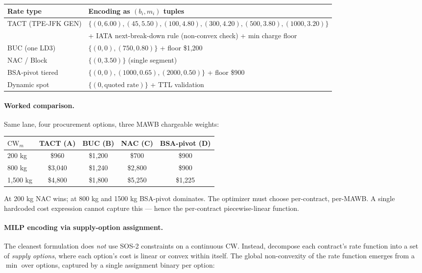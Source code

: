 \documentclass[11pt,a4paper]{article}
\theoremstyle{definition}
\begin{document}
\begin{center}
\begin{tabular}{ll}
\toprule
Rate type & Encoding as \((b_i, m_i)\) tuples \\
\midrule
TACT (TPE-JFK GEN) & \(\{(0, 6.00), (45, 5.50), (100, 4.80), (300, 4.20), (500, 3.80), (1000, 3.20)\}\) \\
  & \quad + IATA next-break-down rule (non-convex check) + min charge floor \\
BUC (one LD3) & \(\{(0, 0), (750, 0.80)\}\) + floor \$1{,}200 \\
NAC / Block & \(\{(0, 3.50)\}\) (single segment) \\
BSA-pivot tiered & \(\{(0, 0), (1000, 0.65), (2000, 0.50)\}\) + floor \$900 \\
Dynamic spot & \(\{(0, \text{quoted rate})\}\) + TTL validation \\
\bottomrule
\end{tabular}
\end{center}

\paragraph{Worked comparison.}
Same lane, four procurement options, three MAWB chargeable weights:

\begin{center}
\begin{tabular}{lcccc}
\toprule
\(\text{CW}_m\) & TACT (A) & BUC (B) & NAC (C) & BSA-pivot (D) \\
\midrule
200 kg & \$960 & \$1{,}200 & \$700 & \$900 \\
800 kg & \$3{,}040 & \$1{,}240 & \$2{,}800 & \$900 \\
1{,}500 kg & \$4{,}800 & \$1{,}800 & \$5{,}250 & \$1{,}225 \\
\bottomrule
\end{tabular}
\end{center}

At 200 kg NAC wins; at 800 kg and 1500 kg BSA-pivot dominates. The optimizer
must choose per-contract, per-MAWB. A single hardcoded cost expression cannot
capture this — hence the per-contract piecewise-linear function.

\paragraph{MILP encoding via supply-option assignment.}
The cleanest formulation does \emph{not} use SOS-2 constraints on a continuous CW.
Instead, decompose each contract's rate function into a set of \emph{supply options},
where each option's cost is linear or convex within itself. The global non-convexity
of the rate function emerges from a \(\min\) over options, captured by a single
assignment binary per option:
\end{document}
